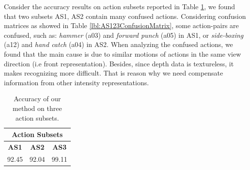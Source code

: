 \documentclass[review]{elsarticle}
\begin{document}
Consider the accuracy results on action subsets reported in Table \ref{lbl:MBHandAS123}, we found that two subsets AS1, AS2 contain many confused actions. Considering confusion matrices as showed in Table \ref{lbl:AS123ConfusionMatrix}, some action-pairs are confused, such as: \textit{hammer} (a03) and \textit{forward punch} (a05) in AS1, or \textit{side-boxing} (a12) and \textit{hand catch} (a04) in AS2. When analyzing the confused actions, we found that the main cause is due to similar motions of actions in the same view direction (i.e front representation). Besides, since depth data is textureless, it makes recognizing more difficult. That is reason why we need compensate information from other intensity representations.
\begin{table}[H]
	\begin{center}
		\begin{tabular}{ccc}
		
		       \multicolumn{ 3}{c}{{\bf Action Subsets}} \\
		\hline
		     {\bf AS1} &      {\bf AS2} &      {\bf AS3} \\
		\hline
		        92.45  &         92.04  &         99.11  \\
		
		\end{tabular}
	\end{center}
	\caption{\label{lbl:MBHandAS123}Accuracy of our method on three action subsets.}
\end{table}
\end{document}
